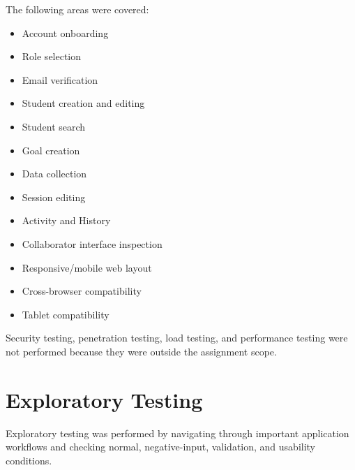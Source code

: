 \documentclass[11pt,a4paper]{article}
\begin{document}
The following areas were covered:

\begin{itemize}
    \item Account onboarding
    \item Role selection
    \item Email verification
    \item Student creation and editing
    \item Student search
    \item Goal creation
    \item Data collection
    \item Session editing
    \item Activity and History
    \item Collaborator interface inspection
    \item Responsive/mobile web layout
    \item Cross-browser compatibility
    \item Tablet compatibility
\end{itemize}

Security testing, penetration testing, load testing, and performance testing were not performed because they were outside the assignment scope.


\section{Exploratory Testing}

Exploratory testing was performed by navigating through important application workflows and checking normal, negative-input, validation, and usability conditions.
\end{document}
